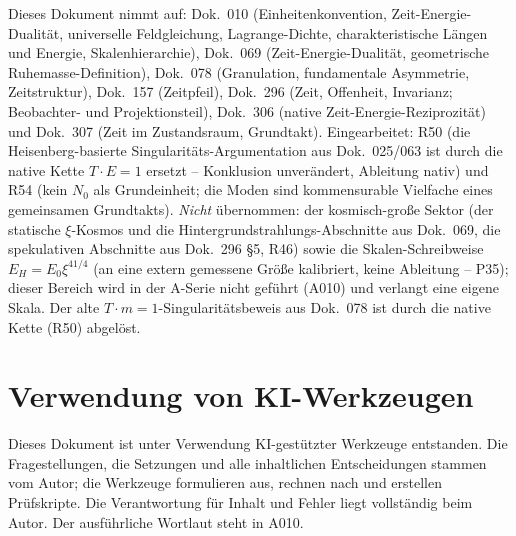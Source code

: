 Dieses Dokument nimmt auf: Dok.~010 (Einheitenkonvention, Zeit-Energie-Dualität,
universelle Feldgleichung, Lagrange-Dichte, charakteristische Längen und Energie,
Skalenhierarchie), Dok.~069 (Zeit-Energie-Dualität, geometrische
Ruhemasse-Definition), Dok.~078 (Granulation, fundamentale Asymmetrie,
Zeitstruktur), Dok.~157 (Zeitpfeil), Dok.~296 (Zeit, Offenheit, Invarianz;
Beobachter- und Projektionsteil), Dok.~306 (native Zeit-Energie-Reziprozität) und
Dok.~307 (Zeit im Zustandsraum, Grundtakt). Eingearbeitet: R50 (die
Heisenberg-basierte Singularitäts-Argumentation aus Dok.~025/063 ist durch die
native Kette $T\cdot E=1$ ersetzt -- Konklusion unverändert, Ableitung nativ) und
R54 (kein $N_0$ als Grundeinheit; die Moden sind kommensurable Vielfache eines
gemeinsamen Grundtakts). \emph{Nicht} übernommen: der kosmisch-große Sektor (der
statische $\xi$-Kosmos und die Hintergrundstrahlungs-Abschnitte aus Dok.~069, die
spekulativen Abschnitte aus
Dok.~296 §5, R46) sowie die Skalen-Schreibweise $E_H=E_0\xi^{41/4}$ (an eine
extern gemessene Größe kalibriert, keine Ableitung -- P35); dieser Bereich wird in der A-Serie nicht
geführt (A010) und verlangt eine eigene Skala. Der alte $T\cdot m=1$-Singularitäts\-beweis
aus Dok.~078 ist durch die native Kette (R50) abgelöst.

\section{Verwendung von KI-Werkzeugen}

Dieses Dokument ist unter Verwendung KI-gestützter Werkzeuge entstanden. Die
Fragestellungen, die Setzungen und alle inhaltlichen Entscheidungen stammen vom
Autor; die Werkzeuge formulieren aus, rechnen nach und erstellen Prüfskripte.
Die Verantwortung für Inhalt und Fehler liegt vollständig beim Autor. Der
ausführliche Wortlaut steht in A010.
